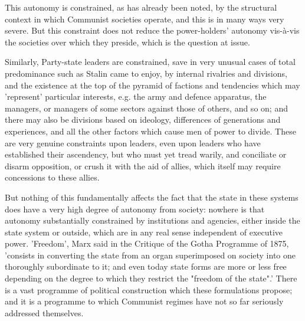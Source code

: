 This autonomy is constrained, as has already been noted, by the structural context in which Communist societies operate, and this is in many ways very severe. But this constraint does not reduce the power-holders' autonomy vis-à-vis the societies over which they preside, which is the question at issue.

Similarly, Party-state leaders are constrained, save in very unusual cases of total predominance such as Stalin came to enjoy, by internal rivalries and divisions, and the existence at the top of the pyramid of factions and tendencies which may 'represent' particular interests, e.g. the army and defence apparatus, the managers, or managers of some sectors against those of others, and so on; and there may also be divisions based on ideology, differences of generations and experiences, and all the other factors which cause men of power to divide. These are very genuine constraints upon leaders, even upon leaders who have established their ascendency, but who must yet tread warily, and conciliate or disarm opposition, or crush it with the aid of allies, which itself may require concessions to these allies.

But nothing of this fundamentally affects the fact that the state in these systems does have a very high degree of autonomy from society: nowhere is that autonomy substantially constrained by institutions and agencies, either inside the state system or outside, which are in any real sense independent of executive power. 'Freedom', Marx said in the Critique of the Gotha Programme of 1875, 'consists in converting the state from an organ superimposed on society into one thoroughly subordinate to it; and even today state forms are more or less free depending on the degree to which they restrict the "freedom of the state".' There is a vast programme of political construction which these formulations propose; and it is a programme to which Communist regimes have not so far seriously addressed themselves.

